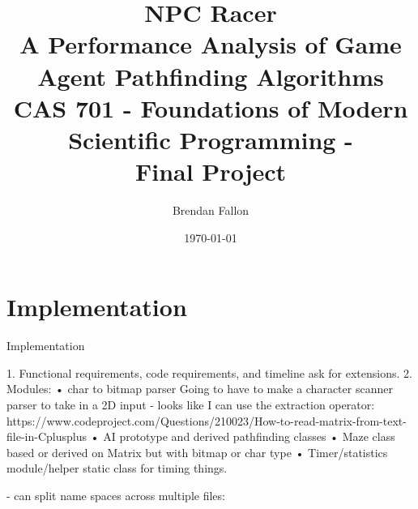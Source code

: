 \documentclass[letterpaper,12pt]{article}  %
\title{ %
    NPC Racer \\
    \large A Performance Analysis of Game Agent Pathfinding
    Algorithms \\
    CAS 701 - Foundations of Modern Scientific Programming - \\
    Final Project}
\date{\today{}} %
\author{Brendan Fallon}
\begin{document}

\maketitle  %

\tableofcontents  %




\section{Implementation}
Implementation


1. Functional requirements, code requirements, and timeline ask for extensions.
2. Modules:
• char to bitmap parser
Going to have to make a character scanner parser to take in a 2D input
- looks like I can use the extraction operator: https://www.codeproject.com/Questions/210023/How-to-read-matrix-from-text-file-in-Cplusplus
• AI prototype and derived pathfinding classes
• Maze class based or derived on Matrix but with bitmap or char type
• Timer/statistics module/helper static class for timing things.

- can split name spaces across multiple files:
%












\newpage
\appendix  %

\end{document}

